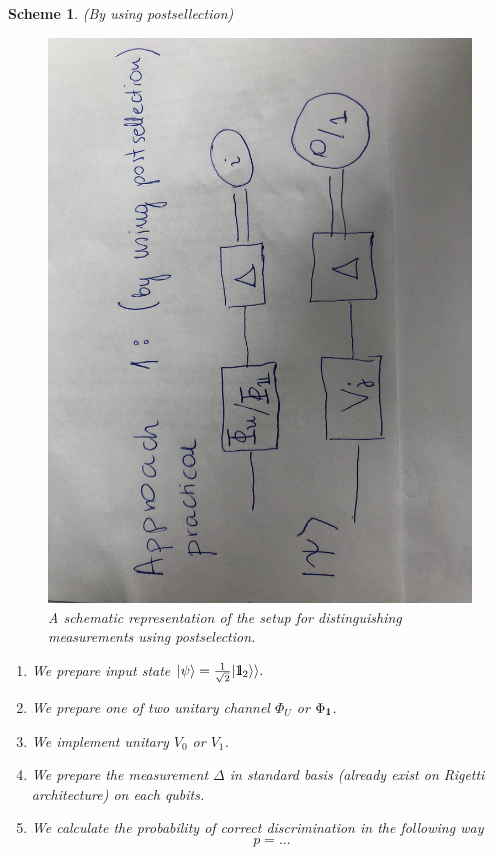 \documentclass[11pt,a4paper,reqno, oneside]{amsart}
\newcommand{\ket}[1]{\ensuremath{|#1\rangle}}
\newcommand{\1}{{\rm 1\hspace{-0.9mm}l}}
\newcommand{\Id}{{\rm 1\hspace{-0.9mm}l}}
\newtheorem{scheme}{Scheme}
\begin{document}
\newpage
\begin{scheme}(By using postsellection)

\begin{figure}[h!]
	\centering 
	\includegraphics[width=0.75\linewidth, angle=-90]{rys-postsellection.jpg} 
	
	\caption{ A schematic representation of the setup for distinguishing
		measurements using postselection. 
	}\label{fig:postsellection}
\end{figure}
\begin{enumerate}
\item We prepare input state $\ket{\psi} = \frac{1}{\sqrt{2} } | \Id_2 \rangle 
\rangle. $
\item We prepare one of two unitary channel $\Phi_{U} $ or $\Phi_{\1}$. 
\item We implement unitary $V_0 $ or $ V_1$.
\item We prepare the measurement $\Delta$ in standard basis (already exist on 
Rigetti architecture) on each qubits.
\item We calculate the probability of correct discrimination in the following 
way
\begin{equation}
p = ...
\end{equation}
\end{enumerate}
\end{scheme}
\end{document}
